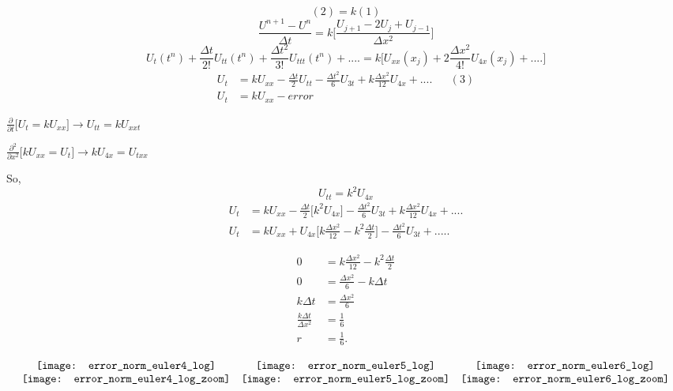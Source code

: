 \documentclass[compress]{beamer}
\begin{document}
\begin{frame}
\[
(2)=k(1)
\]
\[
\frac{U^{n+1}-U^n}{\Delta t}=k\Bigg[\frac{U_{j+1}-2U_j+U_{j-1}}{\Delta x^2}\Bigg]
\]
\[
U_t(t^n)+\frac{\Delta t}{2!}U_{tt}(t^n)+\frac{\Delta t^2}{3!}U_{ttt}(t^n)+....=k\Bigg[U_{xx}(x_j)+2\frac{\Delta x^2}{4!}U_{4x}(x_j)+....\Bigg]
\]
\vspace{.2in}
\begin{align*}
U_t &= kU_{xx}-\frac{\Delta t}{2}U_{tt}-\frac{\Delta t^2}{6}U_{3t}+k\frac{\Delta x^2}{12}U_{4x}+....&&(3) \\
U_t &= kU_{xx}-error
\end{align*}
\end{frame}

\begin{frame}
$\frac{\partial}{\partial t}\Big[U_{t}=kU_{xx}\Big] \longrightarrow U_{tt}=kU_{xxt}$
\vspace{.1in}

$\frac{\partial ^2}{\partial x^2}\Big[kU_{xx}=U_{t}\Big] \longrightarrow kU_{4x}=U_{txx}$ 
\vspace{.1in}

So, $$U_{tt}=k^2U_{4x}$$
\begin{align*}
U_{t}	&=	kU_{xx}-\frac{\Delta t}{2}\Big[k^2U_{4x}\Big]-\frac{\Delta t^2}{6}U_{3t}+k\frac{\Delta x^2}{12}U_{4x}+....	\\
U_{t}	&=	kU_{xx}+U_{4x}\Big[k\frac{\Delta x^2}{12}-k^2\frac{\Delta t}{2}\Big]-\frac{\Delta t^2}{6}U_{3t}+.....
\end{align*}
\end{frame}

\begin{frame}
\begin{align*}
0 			&=k\frac{\Delta x^2}{12}-k^2\frac{\Delta t}{2}	\\
0			&=\frac{\Delta x^2}{6}-k\Delta t 				\\
k\Delta t	&=\frac{\Delta x^2}{6}							\\
\frac{k\Delta t}{\Delta x^2}	&= \frac{1}{6}				\\
r			&=	\frac{1}{6}.	
\end{align*}
\end{frame}

\begin{frame}
\[
\begin{array}{c c c}
\texttt{[image: error\_norm\_euler4\_log]}		&	\texttt{[image: error\_norm\_euler5\_log]}		&	\texttt{[image: error\_norm\_euler6\_log]}		\\
\texttt{[image: error\_norm\_euler4\_log\_zoom]}		&	\texttt{[image: error\_norm\_euler5\_log\_zoom]}		&	\texttt{[image: error\_norm\_euler6\_log\_zoom]}
\end{array}
\]
\end{frame}
\end{document}
